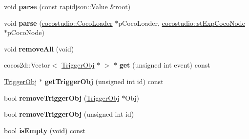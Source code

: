 \begin{DoxyCompactItemize}
\item 
\mbox{\label{classcocostudio_1_1TriggerMng_a277b67937d5227891d70bce3e8317431}} 
void {\bfseries parse} (const rapidjson\+::\+Value \&root)
\item 
\mbox{\label{classcocostudio_1_1TriggerMng_aff20409b15b820963afd94a7c3990118}} 
void {\bfseries parse} (\hyperlink{classcocostudio_1_1CocoLoader}{cocostudio\+::\+Coco\+Loader} $\ast$p\+Coco\+Loader, \hyperlink{structcocostudio_1_1stExpCocoNode}{cocostudio\+::st\+Exp\+Coco\+Node} $\ast$p\+Coco\+Node)
\item 
\mbox{\label{classcocostudio_1_1TriggerMng_a001ae442f3f05c0423129b7d6e246ff1}} 
void {\bfseries remove\+All} (void)
\item 
\mbox{\label{classcocostudio_1_1TriggerMng_a8b9f6a68a0c48d414b9e55e2ca6835c3}} 
cocos2d\+::\+Vector$<$ \hyperlink{classcocostudio_1_1TriggerObj}{Trigger\+Obj} $\ast$ $>$ $\ast$ {\bfseries get} (unsigned int event) const
\item 
\mbox{\label{classcocostudio_1_1TriggerMng_ae7e1fb17bebdd463c58710bbdf8707bb}} 
\hyperlink{classcocostudio_1_1TriggerObj}{Trigger\+Obj} $\ast$ {\bfseries get\+Trigger\+Obj} (unsigned int id) const
\item 
\mbox{\label{classcocostudio_1_1TriggerMng_aaafcd9f8d97d7b41443cf8308eecd74a}} 
bool {\bfseries remove\+Trigger\+Obj} (\hyperlink{classcocostudio_1_1TriggerObj}{Trigger\+Obj} $\ast$Obj)
\item 
\mbox{\label{classcocostudio_1_1TriggerMng_a160631d4cdd69ebbcc247b8caf427ba2}} 
bool {\bfseries remove\+Trigger\+Obj} (unsigned int id)
\item 
\mbox{\label{classcocostudio_1_1TriggerMng_a6b20fc71dcd1a658d903c94f5a6aa4a8}} 
bool {\bfseries is\+Empty} (void) const
\item 
\mbox{\label{classcocostudio_1_1TriggerMng_ad27fb21740aaf69104792e3616bb2872}} 

\end{DoxyCompactItemize}
